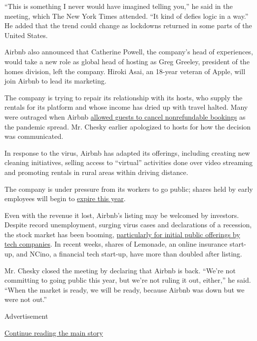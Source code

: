 ``This is something I never would have imagined telling you,'' he said
in the meeting, which The New York Times attended. ``It kind of defies
logic in a way.'' He added that the trend could change as lockdowns
returned in some parts of the United States.

Airbnb also announced that Catherine Powell, the company's head of
experiences, would take a new role as global head of hosting as Greg
Greeley, president of the homes division, left the company. Hiroki Asai,
an 18-year veteran of Apple, will join Airbnb to lead its marketing.

The company is trying to repair its relationship with its hosts, who
supply the rentals for its platform and whose income has dried up with
travel halted. Many were outraged when Airbnb
\href{https://www.nytimes3xbfgragh.onion/2020/03/10/technology/airbnb-hosts-coronavirus.html}{allowed
guests to cancel nonrefundable bookings} as the pandemic spread. Mr.
Chesky earlier apologized to hosts for how the decision was
communicated.

In response to the virus, Airbnb has adapted its offerings, including
creating new cleaning initiatives, selling access to ``virtual''
activities done over video streaming and promoting rentals in rural
areas within driving distance.

The company is under pressure from its workers to go public; shares held
by early employees will begin to
\href{https://www.nytimes3xbfgragh.onion/2019/09/20/technology/airbnb-employees-ipo-payouts.html}{expire
this year}.

Even with the revenue it lost, Airbnb's listing may be welcomed by
investors. Despite record unemployment, surging virus cases and
declarations of a recession, the stock market has been booming,
\href{https://www.nytimes3xbfgragh.onion/2020/06/17/technology/ipo-pandemic.html}{particularly
for initial public offerings by tech companies}. In recent weeks, shares
of Lemonade, an online insurance start-up, and NCino, a financial tech
start-up, have more than doubled after listing.

Mr. Chesky closed the meeting by declaring that Airbnb is back. ``We're
not committing to going public this year, but we're not ruling it out,
either,'' he said. ``When the market is ready, we will be ready, because
Airbnb was down but we were not out.''

Advertisement

\protect\hyperlink{after-bottom}{Continue reading the main story}

